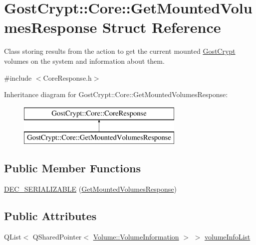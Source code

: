 \hypertarget{struct_gost_crypt_1_1_core_1_1_get_mounted_volumes_response}{}\section{Gost\+Crypt\+:\+:Core\+:\+:Get\+Mounted\+Volumes\+Response Struct Reference}
\label{struct_gost_crypt_1_1_core_1_1_get_mounted_volumes_response}


Class storing results from the action to get the current mounted \hyperlink{namespace_gost_crypt}{Gost\+Crypt} volumes on the system and information about them.  




{\ttfamily \#include $<$Core\+Response.\+h$>$}

Inheritance diagram for Gost\+Crypt\+:\+:Core\+:\+:Get\+Mounted\+Volumes\+Response\+:\begin{figure}[H]
\begin{center}
\leavevmode
\includegraphics[height=2.000000cm]{struct_gost_crypt_1_1_core_1_1_get_mounted_volumes_response}
\end{center}
\end{figure}
\subsection*{Public Member Functions}
\begin{DoxyCompactItemize}
\item 
\hyperlink{struct_gost_crypt_1_1_core_1_1_get_mounted_volumes_response_abdf889829ae959cba6fc9b7d5cd4afc1}{D\+E\+C\+\_\+\+S\+E\+R\+I\+A\+L\+I\+Z\+A\+B\+LE} (\hyperlink{struct_gost_crypt_1_1_core_1_1_get_mounted_volumes_response}{Get\+Mounted\+Volumes\+Response})
\end{DoxyCompactItemize}
\subsection*{Public Attributes}
\begin{DoxyCompactItemize}
\item 
Q\+List$<$ Q\+Shared\+Pointer$<$ \hyperlink{struct_gost_crypt_1_1_volume_1_1_volume_information}{Volume\+::\+Volume\+Information} $>$ $>$ \hyperlink{struct_gost_crypt_1_1_core_1_1_get_mounted_volumes_response_a63b5e16814c7a891e0e368c1e442bdf2}{volume\+Info\+List}
\end{DoxyCompactItemize}


